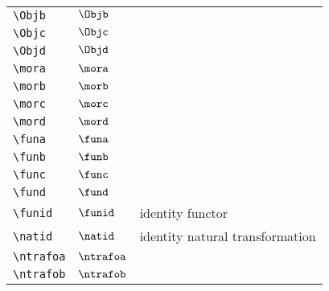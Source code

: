\begin{longtable}{lll}
  {\color[rgb]{0.5,0.5,0.5}\texttt{\textbackslash Objb}}                                                    & $\Objb$                    & \\
  {\color[rgb]{0.5,0.5,0.5}\texttt{\textbackslash Objc}}                                                    & $\Objc$                    & \\
  {\color[rgb]{0.5,0.5,0.5}\texttt{\textbackslash Objd}}                                                    & $\Objd$                    & \\
  {\color[rgb]{0.5,0.5,0.5}\texttt{\textbackslash mora}}                                                    & $\mora$                    & \\
  {\color[rgb]{0.5,0.5,0.5}\texttt{\textbackslash morb}}                                                    & $\morb$                    & \\
  {\color[rgb]{0.5,0.5,0.5}\texttt{\textbackslash morc}}                                                    & $\morc$                    & \\
  {\color[rgb]{0.5,0.5,0.5}\texttt{\textbackslash mord}}                                                    & $\mord$                    & \\
  {\color[rgb]{0.5,0.5,0.5}\texttt{\textbackslash funa}}                                                    & $\funa$                    & \\
  {\color[rgb]{0.5,0.5,0.5}\texttt{\textbackslash funb}}                                                    & $\funb$                    & \\
  {\color[rgb]{0.5,0.5,0.5}\texttt{\textbackslash func}}                                                    & $\func$                    & \\
  {\color[rgb]{0.5,0.5,0.5}\texttt{\textbackslash fund}}                                                    & $\fund$                    & \\
  {\color[rgb]{0.5,0.5,0.5}\texttt{\textbackslash funid}}                                                   & $\funid$                   & identity functor\\
  {\color[rgb]{0.5,0.5,0.5}\texttt{\textbackslash natid}}                                                   & $\natid$                   & identity natural transformation\\
  {\color[rgb]{0.5,0.5,0.5}\texttt{\textbackslash ntrafoa}}                                                 & $\ntrafoa$                 & \\
  {\color[rgb]{0.5,0.5,0.5}\texttt{\textbackslash ntrafob}}                                                 & $\ntrafob$                 & \\

\end{longtable}
